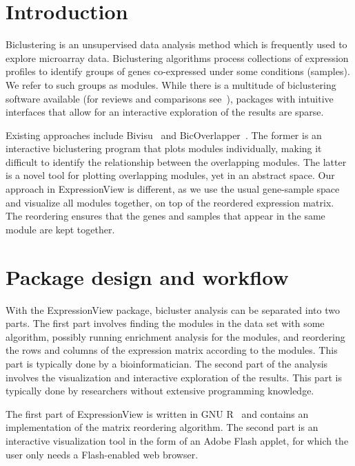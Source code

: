 \documentclass[round]{bioinfo}
\begin{document}
\vspace*{-9pt}
\section{Introduction}
Biclustering is an unsupervised data analysis method which is
frequently used to explore microarray data. Biclustering algorithms
process collections of expression profiles to identify groups of genes
co-expressed under some conditions (samples). We refer to such groups
as modules. While there is a multitude of biclustering software
available (for reviews  and comparisons
see~\cite{madeira04,ihmels04,prelic06}), packages with intuitive
interfaces that allow for an interactive exploration of the results
are sparse. 

Existing approaches include Bivisu~\citep{cheng07} and
BicOverlapper~\citep{santamaria08}. The former is an interactive
biclustering program that plots modules individually, making it
difficult to identify the relationship between the overlapping
modules. The latter is a novel tool for plotting overlapping modules,
yet in an abstract space. Our approach in ExpressionView is different,
as we use the usual gene-sample space and visualize all modules
together, on top of the reordered expression matrix. The reordering
ensures that the genes and samples that appear in the same module are
kept together.

\vspace*{-9pt}
\section{Package design and workflow}
With the ExpressionView package, bicluster analysis can be separated
into two parts. The first part involves finding the
modules in the data set with some algorithm, possibly running
enrichment analysis for the modules, and reordering the rows and
columns of the expression matrix according to the modules. This
part is typically done by a bioinformatician. The second part of the
analysis involves the visualization and interactive exploration of the
results. This part is typically done by researchers without extensive
programming knowledge.

The first part of ExpressionView is written in GNU
R~\citep{R} and contains an implementation of the matrix reordering
algorithm. The second part is an interactive visualization tool in
the form of an Adobe Flash applet, for which the user only needs a
Flash-enabled web browser.
\end{document}
